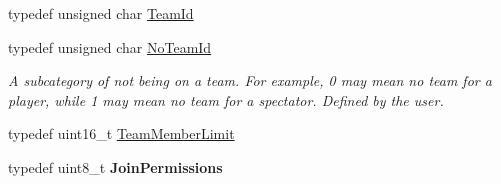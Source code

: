 \begin{DoxyCompactItemize}
\item 
typedef unsigned char \hyperlink{group___t_e_a_m___b_a_l_a_n_c_e_r___g_r_o_u_p_ga79c7825649955f28135498fb3d9f6894}{Team\-Id}
\item 
\hypertarget{group___t_e_a_m___m_a_n_a_g_e_r___g_r_o_u_p_gadd1e99b7724ceb0f6794f46de31a6b02}{typedef unsigned char \hyperlink{group___t_e_a_m___m_a_n_a_g_e_r___g_r_o_u_p_gadd1e99b7724ceb0f6794f46de31a6b02}{No\-Team\-Id}}\label{group___t_e_a_m___m_a_n_a_g_e_r___g_r_o_u_p_gadd1e99b7724ceb0f6794f46de31a6b02}

\begin{DoxyCompactList}\small\item\em A subcategory of not being on a team. For example, 0 may mean no team for a player, while 1 may mean no team for a spectator. Defined by the user. \end{DoxyCompactList}\item 
typedef uint16\-\_\-t \hyperlink{group___t_e_a_m___m_a_n_a_g_e_r___g_r_o_u_p_ga236290d3c5e0d6b3b4559ba851f02bed}{Team\-Member\-Limit}
\item 
\hypertarget{namespace_rak_net_a1b425752df53ff693fc26dceeada01de}{typedef uint8\-\_\-t {\bfseries Join\-Permissions}}\label{namespace_rak_net_a1b425752df53ff693fc26dceeada01de}

\end{DoxyCompactItemize}
